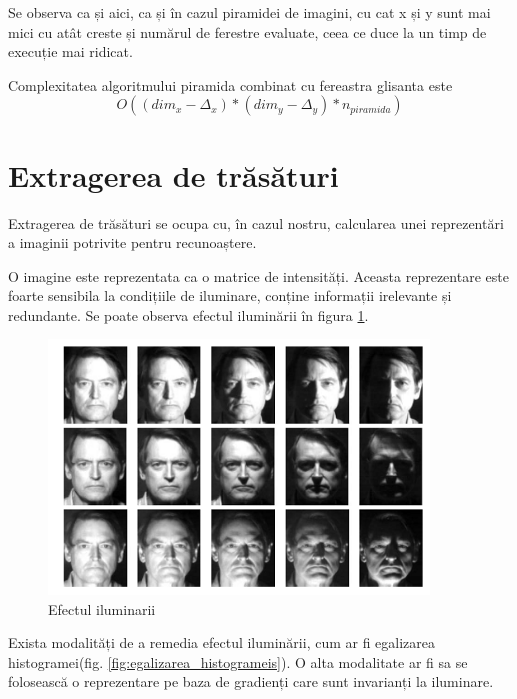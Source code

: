 Se observa ca și aici, ca și în cazul piramidei de imagini, cu cat x și y sunt mai mici cu atât creste și numărul de ferestre evaluate, ceea ce duce la un timp de execuție mai ridicat.

Complexitatea algoritmului piramida combinat cu fereastra glisanta este 
$${O((dim_x-\Delta_x)*(dim_y-\Delta_y)*n_{piramida})}$$

\pagebreak
\section{Extragerea de trăsături}

Extragerea de trăsături se ocupa cu, în cazul nostru, calcularea unei reprezentări a imaginii potrivite pentru recunoaștere.

O imagine este reprezentata ca o matrice de intensități.
Aceasta reprezentare este foarte sensibila la condițiile de iluminare, conține informații irelevante și redundante.
Se poate observa efectul iluminării în figura \ref{fig:efectul_iluminarii}.

\begin{figure}[H]
	\centering
		\includegraphics[width=0.90\textwidth]{imagini/efectul_iluminarii.png}
	\caption{Efectul iluminarii}
	\label{fig:efectul_iluminarii}
\end{figure}

Exista modalități de a remedia efectul iluminării, cum ar fi egalizarea histogramei(fig. \ref{fig:egalizarea_histogrameis}).
O alta modalitate ar fi sa se folosească o reprezentare pe baza de gradienți care sunt invarianți la iluminare.

